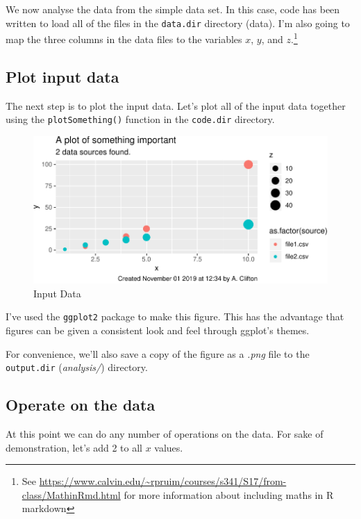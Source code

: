 \documentclass[11pt,]{article}
\let\rmarkdownfootnote\footnote%
\def\footnote{\protect\rmarkdownfootnote}
\begin{document}
We now analyse the data from the simple data set. In this case, code has been written to load all of the files in the \texttt{data.dir} directory (data). I'm also going to map the three columns in the data files to the variables \(x\), \(y\), and \(z\).\footnote{See \url{https://www.calvin.edu/~rpruim/courses/s341/S17/from-class/MathinRmd.html} for more information about including maths in R markdown}

\hypertarget{plot-input-data}{%
\subsection{Plot input data}\label{plot-input-data}}

The next step is to plot the input data. Let's plot all of the input data together using the \texttt{plotSomething()} function in the \texttt{code.dir} directory.

\begin{figure}
\centering
\includegraphics{main_files/figure-latex/plot-input-data-1.pdf}
\caption{\label{fig:plot-input-data}Input Data}
\end{figure}

I've used the \texttt{ggplot2} package to make this figure. This has the advantage that figures can be given a consistent look and feel through ggplot's themes.

For convenience, we'll also save a copy of the figure as a \emph{.png} file to the \texttt{output.dir} (\emph{analysis/}) directory.

\hypertarget{operate-on-the-data}{%
\subsection{Operate on the data}\label{operate-on-the-data}}

At this point we can do any number of operations on the data. For sake of demonstration, let's add 2 to all \(x\) values.
\end{document}
